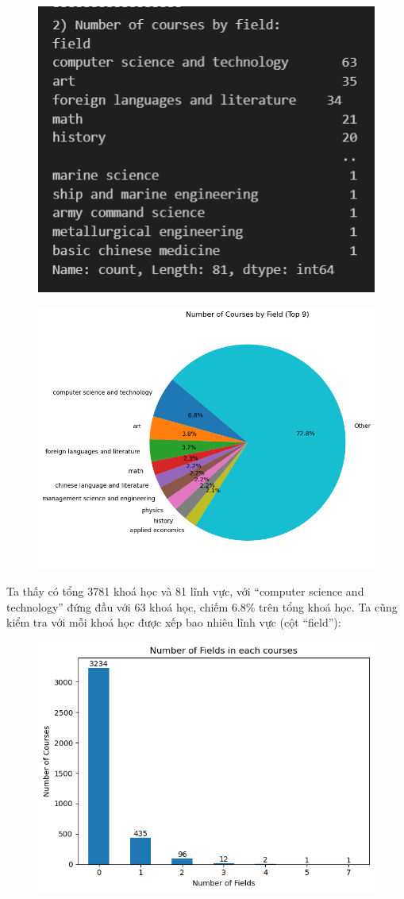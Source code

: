 \begin{figure}[h]
    \centering
    \includegraphics[width=0.35\linewidth]{figures/12.png}
\end{figure}
\newpage
\begin{figure}
    \centering
    \includegraphics[width=0.7\linewidth]{figures/13.png}
\end{figure}
Ta thấy có tổng 3781 khoá học và 81 lĩnh vực, với “computer science and technology” đứng đầu với 63 khoá học, chiếm 6.8\% trên tổng khoá học. Ta cũng kiểm tra với mỗi khoá học được xếp bao nhiêu lĩnh vực (cột “field”):
\begin{figure}[h]
    \centering
    \includegraphics[width=0.9\linewidth]{figures/14.png}
\end{figure}\\
